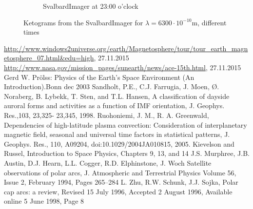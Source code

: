 \documentclass[10pt,a4paper]{article}
\begin{document}
\begin{figure}[h]
\begin{subfigure}{0.3\textwidth}
	\caption{ SvalbardImager at 23:00 o'clock \label{SBI_6_23}}
\end{subfigure}
\caption{Ketograms from the SvalbardImager for $\lambda=6300 \cdot 10^{-10} \mathrm{m}$, different times }
\label{SBI_6_timedevelop}
\end{figure}
\newpage


\begin{thebibliography}{mustermarke}
 \url{http://www.windows2universe.org/earth/Magnetosphere/tour/tour_earth_magnetosphere_07.html&edu=high}, 27.11.2015
 \url{http://www.nasa.gov/mission_pages/sunearth/news/ace-15th.html}, 27.11.2015
 Gerd W. Prölss: Physics of the Earth's Space Environment (An Introduction).Bonn  dec 2003 
 Sandholt, P.E., C.J. Farrugia, J. Moen, Ø. Noraberg, B. Lybekk, T. Sten, and T.L. Hansen, A classification of dayside auroral forms and activities as a function of IMF orientation, J. Geophys. Res.,103, 23,325-
23,345, 1998.
 Ruohoniemi, J. M., R. A. Greenwald, Dependencies of high-latitude plasma convection: Consideration of interplanetary magnetic field, seasonal and universal time factors in statistical patterns, J. Geophys.
Res., 110, A09204, doi:10.1029/2004JA010815, 2005.
 Kievelson and Russel, Introduction to Space Physics, Chapters 9, 13, and 14
 J.S. Murphree, J.B. Austin, D.J. Hearn, L.L. Cogger, R.D. Elphinstone, J. Woch Satellite observations of polar arcs, J. Atmospheric and Terrestrial Physics
Volume 56, Issue 2, February 1994, Pages 265–284
     L. Zhu, R.W. Schunk, J.J. Sojka, Polar cap arcs: a review, Revised 15 July 1996, Accepted 2 August 1996, Available online 5 June 1998, Page 8
\end{thebibliography}
\end{document}
